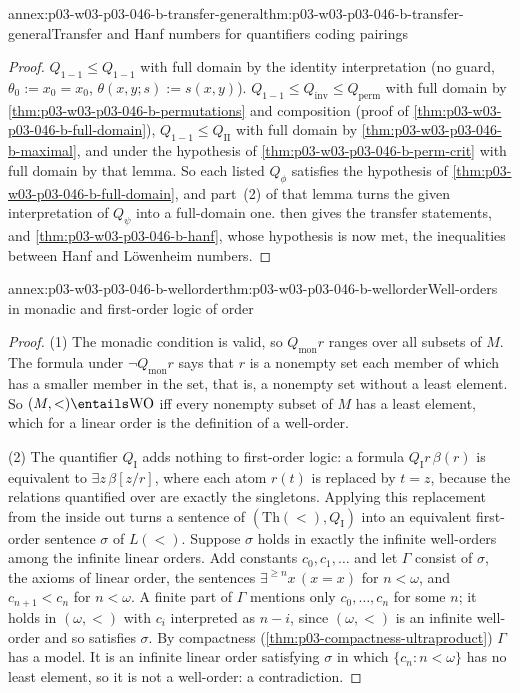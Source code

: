 \begin{annexitem}{annex:p03-w03-p03-046-b-transfer-general}{thm:p03-w03-p03-046-b-transfer-general}{Transfer and Hanf numbers for quantifiers coding pairings}
\begin{proof}
\(Q_{1-1}\le Q_{1-1}\) with full domain by the identity interpretation (no
guard, \(\theta_0:=x_0=x_0\), \(\theta(x,y;s):=s(x,y)\)).
\(Q_{1-1}\le Q_{\mathrm{inv}}\le Q_{\mathrm{perm}}\) with full domain by
\cref{thm:p03-w03-p03-046-b-permutations} and composition (proof of
\cref{thm:p03-w03-p03-046-b-full-domain}), \(Q_{1-1}\le Q_{\mathrm{II}}\)
with full domain by \cref{thm:p03-w03-p03-046-b-maximal}, and under the
hypothesis of \cref{thm:p03-w03-p03-046-b-perm-crit} with full domain by
that lemma. So each listed \(Q_\phi\) satisfies the hypothesis of
\cref{thm:p03-w03-p03-046-b-full-domain}, and part~(2) of that lemma turns
the given interpretation of \(Q_\psi\) into a full-domain one.
 then gives the transfer statements,
and \cref{thm:p03-w03-p03-046-b-hanf}, whose hypothesis is now met, the
inequalities between Hanf and L\"owenheim numbers.
\end{proof}
\end{annexitem}

\begin{annexitem}{annex:p03-w03-p03-046-b-wellorder}{thm:p03-w03-p03-046-b-wellorder}{Well-orders in monadic and first-order logic of order}
\begin{proof}
(1) The monadic condition is valid, so \(Q_{\mathrm{mon}}r\) ranges over
all subsets of \(M\). The formula under \(\neg Q_{\mathrm{mon}}r\) says that
\(r\) is a nonempty set each member of which has a smaller member in the
set, that is, a nonempty set without a least element. So
\((M,<)\entails\mathrm{WO}\) iff every nonempty subset of \(M\) has a least
element, which for a linear order is the definition of a well-order.

(2) The quantifier \(Q_{\mathrm I}\) adds nothing to first-order logic: a
formula \(Q_{\mathrm I}r\,\beta(r)\) is equivalent to \(\exists
z\,\beta[z/r]\), where each atom \(r(t)\) is replaced by \(t=z\), because
the relations quantified over are exactly the singletons. Applying this
replacement from the inside out turns a sentence of
\((\mathrm{Th}(<),Q_{\mathrm I})\) into an equivalent first-order sentence
\(\sigma\) of \(L(<)\). Suppose \(\sigma\) holds in exactly the infinite
well-orders among the infinite linear orders. Add constants
\(c_0,c_1,\dots\) and let \(\Gamma\) consist of \(\sigma\), the axioms of
linear order, the sentences \(\exists^{\ge n}x\,(x=x)\) for \(n<\omega\),
and \(c_{n+1}<c_n\) for \(n<\omega\). A finite part of \(\Gamma\) mentions
only \(c_0,\dots,c_n\) for some \(n\); it holds in \((\omega,<)\) with
\(c_i\) interpreted as \(n-i\), since \((\omega,<)\) is an infinite
well-order and so satisfies \(\sigma\). By compactness
(\cref{thm:p03-compactness-ultraproduct}) \(\Gamma\) has a model. It is an
infinite linear order satisfying \(\sigma\) in which \(\{c_n:n<\omega\}\)
has no least element, so it is not a well-order: a contradiction.
\end{proof}
\end{annexitem}

